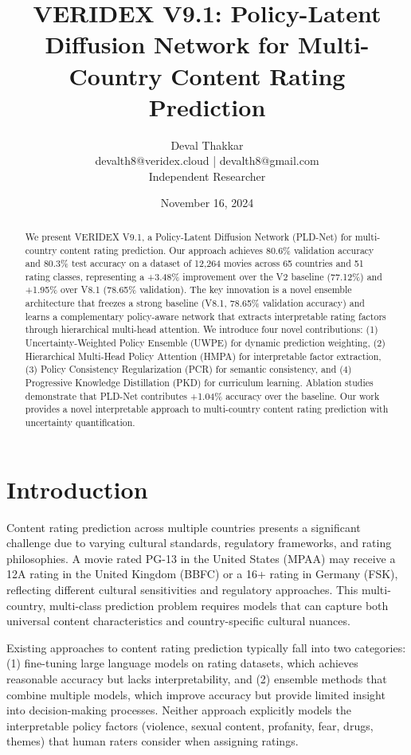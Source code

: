 \documentclass[11pt]{article}
\title{VERIDEX V9.1: Policy-Latent Diffusion Network for Multi-Country Content Rating Prediction}
\author{Deval Thakkar\\
\small{devalth8@veridex.cloud | devalth8@gmail.com}\\
\small{Independent Researcher}}
\date{November 16, 2024}
\begin{document}
\maketitle

\begin{abstract}
We present VERIDEX V9.1, a Policy-Latent Diffusion Network (PLD-Net) for multi-country content rating prediction. Our approach achieves 80.6\% validation accuracy and 80.3\% test accuracy on a dataset of 12,264 movies across 65 countries and 51 rating classes, representing a +3.48\% improvement over the V2 baseline (77.12\%) and +1.95\% over V8.1 (78.65\% validation). The key innovation is a novel ensemble architecture that freezes a strong baseline (V8.1, 78.65\% validation accuracy) and learns a complementary policy-aware network that extracts interpretable rating factors through hierarchical multi-head attention. We introduce four novel contributions: (1) Uncertainty-Weighted Policy Ensemble (UWPE) for dynamic prediction weighting, (2) Hierarchical Multi-Head Policy Attention (HMPA) for interpretable factor extraction, (3) Policy Consistency Regularization (PCR) for semantic consistency, and (4) Progressive Knowledge Distillation (PKD) for curriculum learning. Ablation studies demonstrate that PLD-Net contributes +1.04\% accuracy over the baseline. Our work provides a novel interpretable approach to multi-country content rating prediction with uncertainty quantification.
\end{abstract}

\section{Introduction}

Content rating prediction across multiple countries presents a significant challenge due to varying cultural standards, regulatory frameworks, and rating philosophies. A movie rated PG-13 in the United States (MPAA) may receive a 12A rating in the United Kingdom (BBFC) or a 16+ rating in Germany (FSK), reflecting different cultural sensitivities and regulatory approaches. This multi-country, multi-class prediction problem requires models that can capture both universal content characteristics and country-specific cultural nuances.

Existing approaches to content rating prediction typically fall into two categories: (1) fine-tuning large language models on rating datasets, which achieves reasonable accuracy but lacks interpretability, and (2) ensemble methods that combine multiple models, which improve accuracy but provide limited insight into decision-making processes. Neither approach explicitly models the interpretable policy factors (violence, sexual content, profanity, fear, drugs, themes) that human raters consider when assigning ratings.
\end{document}
